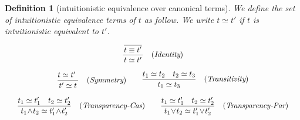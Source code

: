 \documentclass[12pt]{article}
\newtheorem{Definition}{Definition}[section]
\begin{document}
\pagebreak
\begin{Definition}[intuitionistic equivalence over canonical terms]
  \label{equality_on_CANONICALS}
  We define the set of intuitionistic equivalence terms of $t$ as follow.
  We write $t \simeq t'$ if $t$ is intuitionistic equivalent to $t'$.
  \begin{displaymath}
    \begin{array}{c}
      
      \begin{array}{rl}
          \dfrac{
            \dfrac{}{
              \raisebox{0.5ex}[2.3ex][0ex]{$t \equiv t'$}
            }
          }{
            t \simeq t'
          }  &  (\text{\it Identity})
      \end{array}  \\
      \\
      
      \begin{array}{rl}
        \begin{array}{rl}
          \dfrac{
            t \simeq t'\
          }{
            t' \simeq t
          }  &  (\text{\it Symmetry})
        \end{array}
        
        & \begin{array}{rl}
            \dfrac{t_1 \simeq t_2 \quad t_2 \simeq t_3}{
              t_1 \simeq t_3
            }  &  (\text{\it Transitivity})
          \end{array}
      \end{array}  \\
      \\
      
      \begin{array}{ll}
        \begin{array}{rl}
          \dfrac{t_1 \simeq t'_1 \quad t_2 \simeq t'_2}{
            t_1 \!\wedge\! t_2 \simeq t'_1 \!\wedge\! t'_2
          }  &  (\text{\it Transparency-Cas})
        \end{array}
        
        & \begin{array}{rl}
            \dfrac{t_1 \simeq t'_1 \quad t_2 \simeq t'_2}{
              t_1 \!\vee\! t_2 \simeq t'_1 \!\vee\! t'_2
            }  &  (\text{\it Transparency-Par})
          \end{array}
      \end{array}  \\
      \\


\end{array}
\end{displaymath}
\end{Definition}
\end{document}
